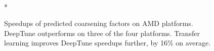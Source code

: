 \begin{figure}
  \centering %
  \\*
  \caption[Speedups of predicted thread coarsening factors on AMD]{%
    Speedups of predicted coarsening factors on AMD platforms. DeepTune outperforms \citeauthor{Magni2014} on three of the four platforms. Transfer learning improves DeepTune speedups further, by 16\% on average.%
  }%
  \label{fig:pact-speedup-left}
\end{figure}

